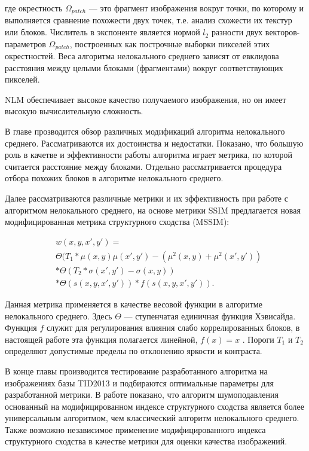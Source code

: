  \noindent где окрестность $\Omega_{patch}$ --- это фрагмент изображения вокруг точки, по которому и выполняется сравнение похожести двух точек, т.е. анализ схожести их текстур или блоков. Числитель в экспоненте является нормой $l_2$ разности двух векторов-параметров $\Omega_{patch}$, построенных как построчные выборки пикселей этих окрестностей. Веса алгоритма нелокального среднего зависят от евклидова расстояния между целыми блоками (фрагментами) вокруг соответствующих пикселей. 
 
NLM обеспечивает высокое качество получаемого изображения, но он имеет высокую вычислительную сложность. 

В главе прозводится обзор различных модификаций алгоритма нелокального среднего. Рассматриваются их достоинства и недостатки. Показано, что большую роль в качетве и эффективности работы алгоритма играет метрика, по которой считается расстояние между блоками. Отдельно рассматривается процедура отбора похожих блоков в алгоритме нелокального среднего.

Далее рассматриваются различные метрики и их эффективность при работе с алгоритмом нелокального среднего, на основе метрики SSIM предлагается новая модифицированная метрика структурного сходства (MSSIM):

\begin{equation}
\begin{split}
	&w(x,y,x',y') = \\
	&\Theta(T_{1}*\mu(x,y)\mu(x',y') - (\mu^{2}(x,y)+\mu^{2}(x',y')) \\
	&* \Theta(T_2*\sigma(x',y') - \sigma(x,y)) \\
	&* \Theta(s(x,y,x',y'))*f(s(x,y,x',y')).
\end{split}
\end{equation}

Данная метрика применяется в качестве весовой функции в алгоритме нелокального среднего. Здесь $\Theta$ --- ступенчатая единичная функция Хэвисайда. Функция $f$ служит для регулирования влияния слабо коррелированных блоков, в настоящей работе эта функция полагается линейной, $f(x)=x$ . Пороги $T_1$ и $T_2$ определяют допустимые пределы по отклонению яркости и контраста. 

В конце главы производится тестирование разработанного алгоритма на изображениях базы TID2013 и подбираются оптимальные параметры для разработанной метрики. В работе показано, что алгоритм шумоподавления основанный на модифицированном индексе структурного сходства является более универсальным алгоритмом, чем классический алгоритм нелокального среднего. Также возможно независимое применение модифицированного индекса структурного сходства в качестве метрики для оценки качества изображений.

